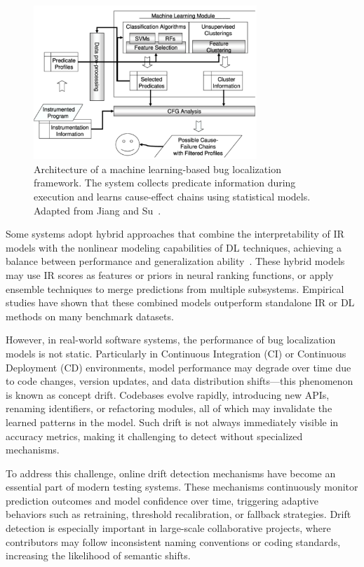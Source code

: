 \documentclass[manuscript,screen,review]{acmart}
\begin{document}
\begin{figure}[htbp]
  \centering
  \includegraphics[width=0.75\textwidth]{picture/5.1fig1.pdf}
  \caption{Architecture of a machine learning-based bug localization framework. The system collects predicate information during execution and learns cause-effect chains using statistical models. Adapted from Jiang and Su~\cite{Li2024}.}
  \label{fig:framework}
\end{figure}

Some systems adopt hybrid approaches that combine the interpretability of IR models with the nonlinear modeling capabilities of DL techniques, achieving a balance between performance and generalization ability~\cite{Li2024}. These hybrid models may use IR scores as features or priors in neural ranking functions, or apply ensemble techniques to merge predictions from multiple subsystems. Empirical studies have shown that these combined models outperform standalone IR or DL methods on many benchmark datasets.

However, in real-world software systems, the performance of bug localization models is not static. Particularly in Continuous Integration (CI) or Continuous Deployment (CD) environments, model performance may degrade over time due to code changes, version updates, and data distribution shifts---this phenomenon is known as concept drift. Codebases evolve rapidly, introducing new APIs, renaming identifiers, or refactoring modules, all of which may invalidate the learned patterns in the model. Such drift is not always immediately visible in accuracy metrics, making it challenging to detect without specialized mechanisms.

To address this challenge, online drift detection mechanisms have become an essential part of modern testing systems. These mechanisms continuously monitor prediction outcomes and model confidence over time, triggering adaptive behaviors such as retraining, threshold recalibration, or fallback strategies. Drift detection is especially important in large-scale collaborative projects, where contributors may follow inconsistent naming conventions or coding standards, increasing the likelihood of semantic shifts.
\end{document}
